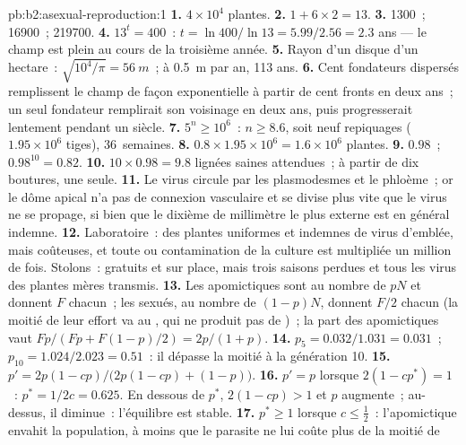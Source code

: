 \begin{solution}{pb:b2:asexual-reproduction:1}
\textbf{1.} $4\times 10^{4}$ plantes.
\textbf{2.} $1 + 6\times 2 = 13$.
\textbf{3.} \num{1300}~; \num{16900}~; \num{219700}.
\textbf{4.} $13^{t} = 400$~: $t = \ln 400/\ln 13 = 5.99/2.56 = 2.3$
ans --- le champ est plein au cours de la troisième année.
\textbf{5.} Rayon d'un disque d'un hectare~: $\sqrt{10^{4}/\pi} = \qty{56}{m}$~;
à \qty{0.5}{m} par an, \num{113} ans.
\textbf{6.} Cent fondateurs dispersés remplissent le champ de façon
exponentielle à partir de cent fronts en deux ans~; un seul fondateur
remplirait son voisinage en deux ans, puis progresserait lentement
pendant un siècle.
\textbf{7.} $5^{n} \ge 10^{6}$~: $n \ge 8.6$, soit neuf repiquages
($1.95\times 10^{6}$ tiges), 36~semaines.
\textbf{8.} $0.8\times 1.95\times 10^{6} = 1.6\times 10^{6}$ plantes.
\textbf{9.} $0.98$~; $0.98^{10} = 0.82$.
\textbf{10.} $10\times 0.98 = 9.8$ lignées saines attendues~; à partir
de dix boutures, une seule.
\textbf{11.} Le virus circule par les plasmodesmes et le phloème~; or le
dôme apical n'a pas de connexion vasculaire et se divise plus vite que
le virus ne se propage, si bien que le dixième de millimètre le plus
externe est en général indemne.
\textbf{12.} Laboratoire~: des plantes uniformes et indemnes de virus
d'emblée, mais coûteuses, et toute  ou contamination de la
culture est multipliée un million de fois. Stolons~: gratuits et sur
place, mais trois saisons perdues et tous les virus des plantes mères
transmis.
\textbf{13.} Les apomictiques sont au nombre de $pN$ et donnent $F$
 chacun~; les sexués, au nombre de $(1 - p)N$, donnent $F/2$
 chacun (la moitié de leur effort va au , qui ne produit
pas de )~; la part des  apomictiques vaut
$Fp/(Fp + F(1 - p)/2)
= 2p/(1 + p)$.
\textbf{14.} $p_5 = 0.032/1.031 = 0.031$~; $p_{10} = 1.024/2.023 =
0.51$~: il dépasse la moitié à la génération 10.
\textbf{15.} $p' = 2p(1 - cp)/\bigl(2p(1 - cp) + (1 - p)\bigr)$.
\textbf{16.} $p' = p$ lorsque $2(1 - cp^*) = 1$~: $p^* = 1/2c = 0.625$.
En dessous de $p^*$, $2(1 - cp) > 1$ et $p$ augmente~; au-dessus, il
diminue~: l'équilibre est stable.
\textbf{17.} $p^* \ge 1$ lorsque $c \le \tfrac12$~: l'apomictique envahit
la population, à moins que le parasite ne lui coûte plus de la moitié de

\end{solution}
